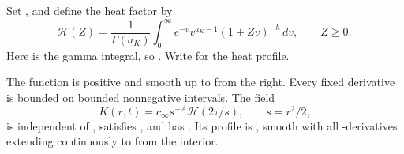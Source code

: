 %
Set , and define the heat factor by
\begin{equation}
 \mathcal H(Z)=\frac1{\Gamma(a_K)}\int_0^\infty
 e^{-v}v^{a_K-1}(1+Zv)^{-h}\,dv,\qquad Z\geq0,
 \tag{A.32}\label{eq:A.32}
\end{equation}
Here  is the gamma
integral, so . Write
 for the
heat profile.

\begin{lemma}\label{lem:A.6}
The function  is positive and smooth up to
 from the right. Every fixed derivative is bounded on bounded
nonnegative intervals. The field
\begin{equation}
 K(r,t)=c_\infty s^{-A}\mathcal H(2\tau/s),\qquad s=r^2/2,
 \tag{A.33}\label{eq:A.33}
\end{equation}
is independent of , satisfies
, and has
. Its profile is
, smooth with all
-derivatives extending continuously to
 from the interior.
\end{lemma}
